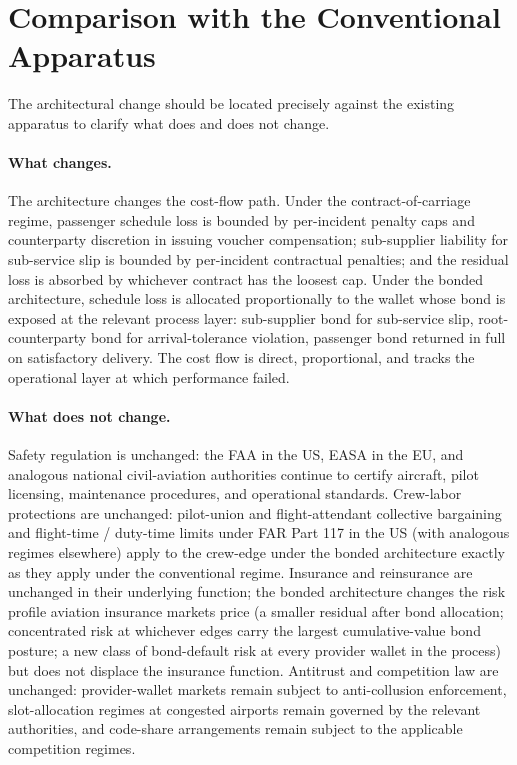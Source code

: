 \documentclass[11pt,a4paper]{article}
\theoremstyle{definition}
\theoremstyle{remark}
\begin{document}
\section{Comparison with the Conventional Apparatus}
\label{sec:comparison}

The architectural change should be located precisely against the
existing apparatus to clarify what does and does not change.

\paragraph{What changes.}
The architecture changes the cost-flow path. Under the
contract-of-carriage regime, passenger schedule loss is bounded
by per-incident penalty caps and counterparty discretion in
issuing voucher compensation; sub-supplier liability for
sub-service slip is bounded by per-incident contractual penalties;
and the residual loss is absorbed by whichever contract has the
loosest cap. Under the bonded architecture, schedule loss is
allocated proportionally to the wallet whose bond is exposed at
the relevant process layer: sub-supplier bond for sub-service
slip, root-counterparty bond for arrival-tolerance violation,
passenger bond returned in full on satisfactory delivery. The
cost flow is direct, proportional, and tracks the operational
layer at which performance failed.

\paragraph{What does not change.}
Safety regulation is unchanged: the FAA in the US, EASA in the
EU, and analogous national civil-aviation authorities continue to
certify aircraft, pilot licensing, maintenance procedures, and
operational standards. Crew-labor protections are unchanged:
pilot-union and flight-attendant collective bargaining and
flight-time / duty-time limits under FAR Part 117 in the US (with
analogous regimes elsewhere) apply to the crew-edge under the
bonded architecture exactly as they apply under the conventional
regime. Insurance and reinsurance are unchanged in their
underlying function; the bonded architecture changes the risk
profile aviation insurance markets price (a smaller residual
after bond allocation; concentrated risk at whichever edges carry
the largest cumulative-value bond posture; a new class of
bond-default risk at every provider wallet in the process) but
does not displace the insurance function. Antitrust and
competition law are unchanged: provider-wallet markets remain
subject to anti-collusion enforcement, slot-allocation regimes at
congested airports remain governed by the relevant authorities,
and code-share arrangements remain subject to the applicable
competition regimes.
\end{document}
